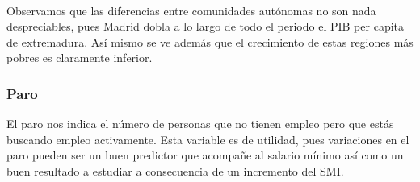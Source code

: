 \documentclass[11pt]{article}
\begin{document}
    \begin{center}
    \end{center}
    { \hspace*{\fill} \\}
    
    Observamos que las diferencias entre comunidades autónomas no son nada
despreciables, pues Madrid dobla a lo largo de todo el periodo el PIB
per capita de extremadura. Así mismo se ve además que el crecimiento de
estas regiones más pobres es claramente inferior.

    \subsubsection{Paro}\label{paro}

    El paro nos indica el número de personas que no tienen empleo pero que
estás buscando empleo activamente. Esta variable es de utilidad, pues
variaciones en el paro pueden ser un buen predictor que acompañe al
salario mínimo así como un buen resultado a estudiar a consecuencia de
un incremento del SMI.
\end{document}
